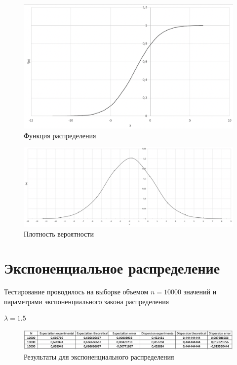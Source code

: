 \documentclass{article}
\begin{document}
		\begin{figure}[!htb]
		    \includegraphics[scale = 0.38]{normal/2.png}
    		\caption{Функция распределения}
		\end{figure}
		 	 	
		\begin{figure}[!htb]
			\includegraphics[scale = 0.32]{normal/3.png}
			\caption{Плотность вероятности}
   		\end{figure}
	\newpage

	\section{Экспоненциальное распределение}
		Тестирование проводилось на выборке объемом $n = 10000$ значений и параметрами экспоненциального закона распределения
		\begin{center}
			$\lambda = 1.5$\\
		\end{center}
		\begin{center}
			\begin{figure}[!htb]
				\includegraphics[scale = 0.51]{exp/1.png}
				\caption{Результаты для экспоненциального распределения}
			\end{figure}
		\end{center}
		
\end{document}
